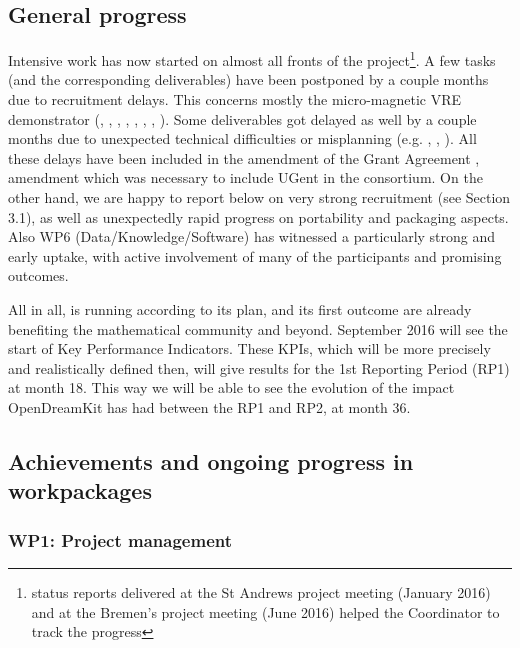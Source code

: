 \documentclass{deliverablereport}
\begin{document}
\subsection{General progress}

Intensive work has now started on almost all fronts of the project\footnote{status reports delivered at the St Andrews project meeting (January 2016) and at the Bremen's project meeting (June 2016) helped the Coordinator to track the progress}. A
few tasks (and the corresponding deliverables) have been postponed by
a couple months due to recruitment delays. This concerns mostly the
micro-magnetic VRE demonstrator (, ,
 , , , ,
 , ). Some deliverables got delayed as well
by a couple months due to unexpected technical difficulties or
misplanning (e.g. ,
, ). All these delays have been included in the amendment of the Grant Agreement
, amendment which was necessary to include UGent in the consortium. On
the other hand, we are happy to report below on very strong
recruitment (see Section 3.1), as well as unexpectedly rapid
progress on portability and packaging aspects. Also WP6
(Data/Knowledge/Software) has witnessed a particularly strong and
early uptake, with active involvement of many of the participants and
promising outcomes.

All in all, \ODK is running according to its plan, and its first
outcome are already benefiting the mathematical community and beyond. September 2016 will see the start of Key Performance Indicators. 
These KPIs, which will be more precisely and realistically defined then, will give results for the 1st Reporting Period (RP1) at month 18. 
This way we will be able to see the evolution of the impact OpenDreamKit has had between the RP1 and RP2, at month 36.


\subsection{Achievements and ongoing progress in workpackages}

\subsubsection{WP1: Project management}
\end{document}
